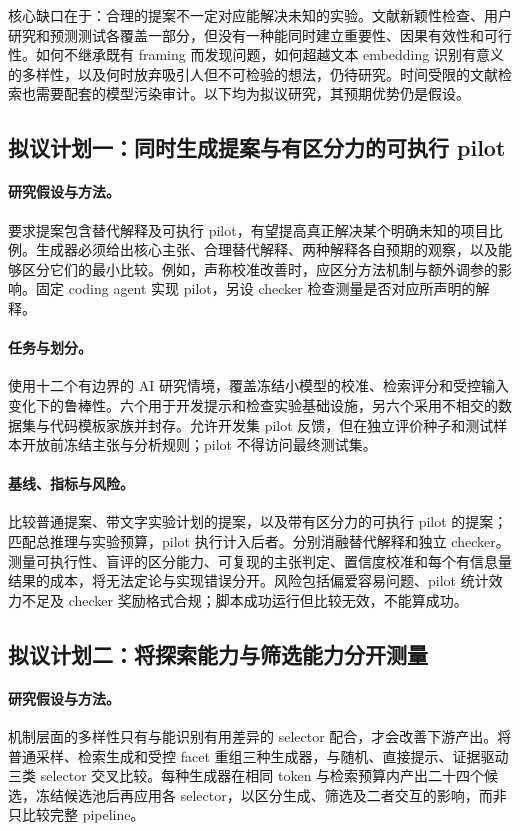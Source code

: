 核心缺口在于：合理的提案不一定对应能解决未知的实验。文献新颖性检查、用户研究和预测测试各覆盖一部分，但没有一种能同时建立重要性、因果有效性和可行性。如何不继承既有 framing 而发现问题，如何超越文本 embedding 识别有意义的多样性，以及何时放弃吸引人但不可检验的想法，仍待研究。时间受限的文献检索也需要配套的模型污染审计。以下均为拟议研究，其预期优势仍是假设。

\subsection{拟议计划一：同时生成提案与有区分力的可执行 pilot}

\paragraph{研究假设与方法。}
要求提案包含替代解释及可执行 pilot，有望提高真正解决某个明确未知的项目比例。生成器必须给出核心主张、合理替代解释、两种解释各自预期的观察，以及能够区分它们的最小比较。例如，声称校准改善时，应区分方法机制与额外调参的影响。固定 coding agent 实现 pilot，另设 checker 检查测量是否对应所声明的解释。

\paragraph{任务与划分。}
使用十二个有边界的 AI 研究情境，覆盖冻结小模型的校准、检索评分和受控输入变化下的鲁棒性。六个用于开发提示和检查实验基础设施，另六个采用不相交的数据集与代码模板家族并封存。允许开发集 pilot 反馈，但在独立评价种子和测试样本开放前冻结主张与分析规则；pilot 不得访问最终测试集。

\paragraph{基线、指标与风险。}
比较普通提案、带文字实验计划的提案，以及带有区分力的可执行 pilot 的提案；匹配总推理与实验预算，pilot 执行计入后者。分别消融替代解释和独立 checker。测量可执行性、盲评的区分能力、可复现的主张判定、置信度校准和每个有信息量结果的成本，将无法定论与实现错误分开。风险包括偏爱容易问题、pilot 统计效力不足及 checker 奖励格式合规；脚本成功运行但比较无效，不能算成功。

\subsection{拟议计划二：将探索能力与筛选能力分开测量}

\paragraph{研究假设与方法。}
机制层面的多样性只有与能识别有用差异的 selector 配合，才会改善下游产出。将普通采样、检索生成和受控 facet 重组三种生成器，与随机、直接提示、证据驱动三类 selector 交叉比较。每种生成器在相同 token 与检索预算内产出二十四个候选，冻结候选池后再应用各 selector，以区分生成、筛选及二者交互的影响，而非只比较完整 pipeline。


